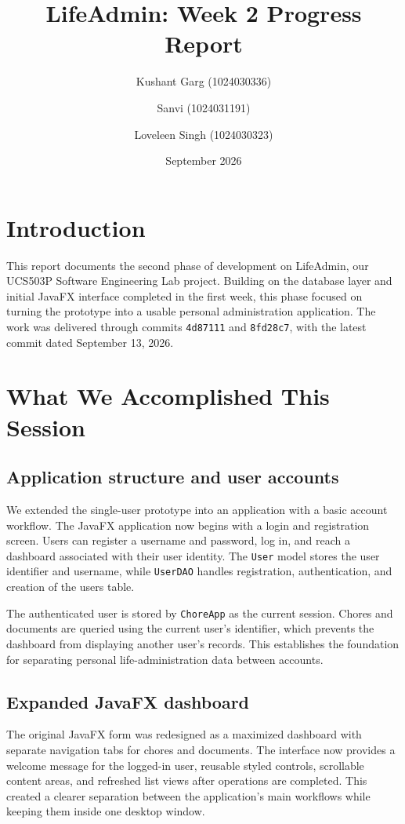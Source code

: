 \documentclass[11pt,a4paper]{article}
\title{LifeAdmin: Week 2 Progress Report}
\author{Kushant Garg (1024030336) \and Sanvi (1024031191) \and Loveleen Singh (1024030323)}
\date{September 2026}
\begin{document}
\maketitle

\section{Introduction}
This report documents the second phase of development on LifeAdmin, our UCS503P Software Engineering Lab project. Building on the database layer and initial JavaFX interface completed in the first week, this phase focused on turning the prototype into a usable personal administration application. The work was delivered through commits \texttt{4d87111} and \texttt{8fd28c7}, with the latest commit dated September 13, 2026.

\section{What We Accomplished This Session}

\subsection{Application structure and user accounts}
We extended the single-user prototype into an application with a basic account workflow. The JavaFX application now begins with a login and registration screen. Users can register a username and password, log in, and reach a dashboard associated with their user identity. The \texttt{User} model stores the user identifier and username, while \texttt{UserDAO} handles registration, authentication, and creation of the users table.

The authenticated user is stored by \texttt{ChoreApp} as the current session. Chores and documents are queried using the current user's identifier, which prevents the dashboard from displaying another user's records. This establishes the foundation for separating personal life-administration data between accounts.

\subsection{Expanded JavaFX dashboard}
The original JavaFX form was redesigned as a maximized dashboard with separate navigation tabs for chores and documents. The interface now provides a welcome message for the logged-in user, reusable styled controls, scrollable content areas, and refreshed list views after operations are completed. This created a clearer separation between the application's main workflows while keeping them inside one desktop window.
\end{document}
